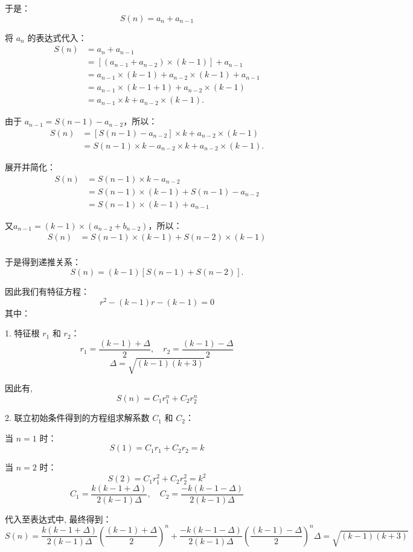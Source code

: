 \documentclass{article}
\begin{document}
于是：
\[
S(n) = a_n + a_{n-1}
\]

将 \(a_n\) 的表达式代入：
\[
\begin{aligned}
S(n) &= a_n + a_{n-1} \\
&= \left[(a_{n-1} + a_{n-2}) \times (k-1)\right] + a_{n-1} \\
&= a_{n-1} \times (k-1) + a_{n-2} \times (k-1) + a_{n-1} \\
&= a_{n-1} \times (k-1+1) + a_{n-2} \times (k-1) \\
&= a_{n-1} \times k + a_{n-2} \times (k-1).
\end{aligned}
\]

由于 \(a_{n-1} = S(n-1) - a_{n-2}\)，所以：
\[
\begin{aligned}
S(n) &= \left[S(n-1) - a_{n-2}\right] \times k + a_{n-2} \times (k-1) \\
&= S(n-1) \times k - a_{n-2} \times k + a_{n-2} \times (k-1).
\end{aligned}
\]

展开并简化：
\[
\begin{aligned}
S(n) &= S(n-1) \times k - a_{n-2} \\
&= S(n-1) \times (k-1) + S(n-1) - a_{n-2} \\
&= S(n-1) \times (k-1) + a_{n-1}
\end{aligned}
\]

又\(a_{n-1} = (k-1) \times (a_{n-2} + b_{n-2})\)，所以：
\[
\begin{aligned}
S(n) &= S(n-1) \times (k-1) + S(n-2) \times (k-1)\\
\end{aligned}
\]

于是得到递推关系：
\[
S(n) = (k-1) \left[S(n-1) + S(n-2)\right].
\]

因此我们有特征方程：
\[
r^2 - (k-1)r - (k-1) = 0
\]
其中：

1. 特征根 \(r_1\) 和 \(r_2\)：
\[
r_1 = \frac{(k-1) + \Delta}{2}, \quad r_2 = \frac{(k-1) - \Delta}{2}
\]
\[
\Delta = \sqrt{(k-1)(k+3)}
\]

因此有,
\[
S(n) = C_1 r_1^n + C_2 r_2^n
\]

2. 联立初始条件得到的方程组求解系数 \(C_1\) 和 \(C_2\)：

当 \(n = 1\) 时：
\[
S(1) = C_1 r_1 + C_2 r_2 = k
\]

当 \(n = 2\) 时：
\[
S(2) = C_1 r_1^2 + C_2 r_2^2 = k^2
\]
\[
C_1 = \frac{k(k-1 + \Delta)}{2(k-1)\Delta}, \quad C_2 = \frac{-k(k-1 - \Delta)}{2(k-1)\Delta}
\]

代入至表达式中, 最终得到：
\[
\boxed{S(n) = \frac{k(k-1+\Delta)}{2(k-1)\Delta} \left(\frac{(k-1) + \Delta}{2}\right)^n + \frac{-k(k-1-\Delta)}{2(k-1)\Delta} \left(\frac{(k-1) - \Delta}{2}\right)^n 
\boxed{\Delta = \sqrt{(k-1)(k+3)}}
}
\]
\end{document}
